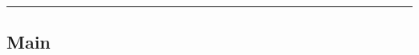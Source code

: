 \documentclass[11pt,letter]{article}
\begin{document}

\noindent\rule{\textwidth}{0.3pt}

\linenumbers

\subsection*{Main}
%
\end{document}
